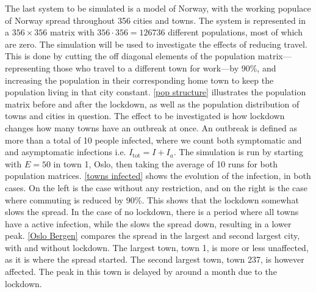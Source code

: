 \documentclass{article}
\begin{document}
    The last system to be simulated is a model of Norway, with the working populace of Norway spread throughout 356 cities and towns. 
    The system is represented in a $356 \times 356$ matrix with $356 \cdot 356 = 126736$ different populations, most of which are zero.
    The simulation will be used to investigate the effects of reducing travel.
    This is done by cutting the off diagonal elements of the population matrix---representing those who travel to a different town for work---by 90\%, and increasing the population in their corresponding home town to keep the population living in that city constant.
    \autoref{pop structure} illustrates the population matrix before and after the lockdown, as well as the population distribution of towns and cities in question.
    The effect to be investigated is how lockdown changes how many towns have an outbreak at once.
    An outbreak is defined as more than a total of 10 people infected, where we count both symptomatic and and asymptomatic infections i.e. $I_\mathrm{tot}=I + I_a$.
    The simulation is run by starting with $E=50$ in town 1, Oslo, then taking the average of 10 runs for both population matrices.
    \autoref{towns infected} shows the evolution of the infection, in both cases. 
    On the left is the case without any restriction, and on the right is the case where commuting is reduced by 90\%. 
    This shows that the lockdown somewhat slows the spread.
    In the case of no lockdown, there is a period where all towns have a active infection, while the slows the spread down, resulting in a lower peak.
    \autoref{Oslo Bergen} compares the spread in the largest and second largest city, with and without lockdown.
    The largest town, town 1, is more or less unaffected, as it is where the spread started.
    The second largest town, town 237, is however affected.
    The peak in this town is delayed by around a month due to the lockdown.
\end{document}
